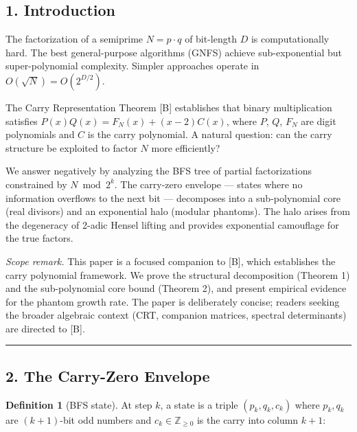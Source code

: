 \documentclass[
  11pt,
]{article}
\begin{document}
\newpage

\subsection{1. Introduction}\label{introduction}

The factorization of a semiprime \(N = p \cdot q\) of bit-length \(D\) is
computationally hard. The best general-purpose algorithms (GNFS) achieve
sub-exponential but super-polynomial complexity. Simpler approaches operate in
\(O(\sqrt{N}) = O(2^{D/2})\).

The Carry Representation Theorem {[}B{]} establishes that binary multiplication
satisfies \(P(x)Q(x) = F_N(x) + (x-2)C(x)\), where \(P\), \(Q\), \(F_N\) are
digit polynomials and \(C\) is the carry polynomial. A natural question: can the
carry structure be exploited to factor \(N\) more efficiently?

We answer negatively by analyzing the BFS tree of partial factorizations
constrained by \(N \bmod 2^k\). The carry-zero envelope --- states where no
information overflows to the next bit --- decomposes into a sub-polynomial core
(real divisors) and an exponential halo (modular phantoms). The halo arises from
the degeneracy of 2-adic Hensel lifting and provides exponential camouflage for
the true factors.

\emph{Scope remark.} This paper is a focused companion to {[}B{]}, which
establishes the carry polynomial framework. We prove the structural
decomposition (Theorem 1) and the sub-polynomial core bound (Theorem 2), and
present empirical evidence for the phantom growth rate. The paper is
deliberately concise; readers seeking the broader algebraic context (CRT,
companion matrices, spectral determinants) are directed to {[}B{]}.

\begin{center}\rule{0.5\linewidth}{0.5pt}\end{center}

\newpage

\subsection{2. The Carry-Zero Envelope}\label{the-carry-zero-envelope}

\textbf{Definition 1} (BFS state). At step \(k\), a state is a triple
\((p_k, q_k, c_k)\) where \(p_k, q_k\) are \((k+1)\)-bit odd numbers and
\(c_k \in \mathbb{Z}_{\geq 0}\) is the carry into column \(k+1\):
\end{document}
